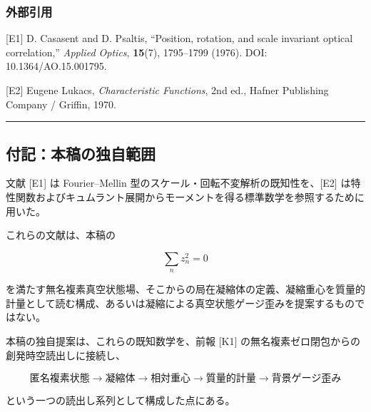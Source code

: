 \documentclass[
  a4paper,
]{ltjsarticle}
\begin{document}
\subsubsection{外部引用}\label{ux5916ux90e8ux5f15ux7528}

{[}E1{]} D. Casasent and D. Psaltis, ``Position, rotation, and scale
invariant optical correlation,'' \emph{Applied Optics}, \textbf{15}(7),
1795--1799 (1976). DOI: 10.1364/AO.15.001795.

{[}E2{]} Eugene Lukacs, \emph{Characteristic Functions}, 2nd ed., Hafner
Publishing Company / Griffin, 1970.

\begin{center}\rule{0.5\linewidth}{0.5pt}\end{center}

\subsection{付記：本稿の独自範囲}\label{ux4ed8ux8a18ux672cux7a3fux306eux72ecux81eaux7bc4ux56f2}

文献 {[}E1{]} は Fourier--Mellin
型のスケール・回転不変解析の既知性を、{[}E2{]}
は特性関数およびキュムラント展開からモーメントを得る標準数学を参照するために用いた。

これらの文献は、本稿の

\[
\sum_n z_n^2=0
\]

を満たす無名複素真空状態場、そこからの局在凝縮体の定義、凝縮重心を質量的計量として読む構成、あるいは凝縮による真空状態ゲージ歪みを提案するものではない。

本稿の独自提案は、これらの既知数学を、前報 {[}K1{]}
の無名複素ゼロ閉包からの創発時空読出しに接続し、

\[
\boxed{
\text{匿名複素状態}
\rightarrow
\text{凝縮体}
\rightarrow
\text{相対重心}
\rightarrow
\text{質量的計量}
\rightarrow
\text{背景ゲージ歪み}
}
\]

という一つの読出し系列として構成した点にある。
\end{document}
